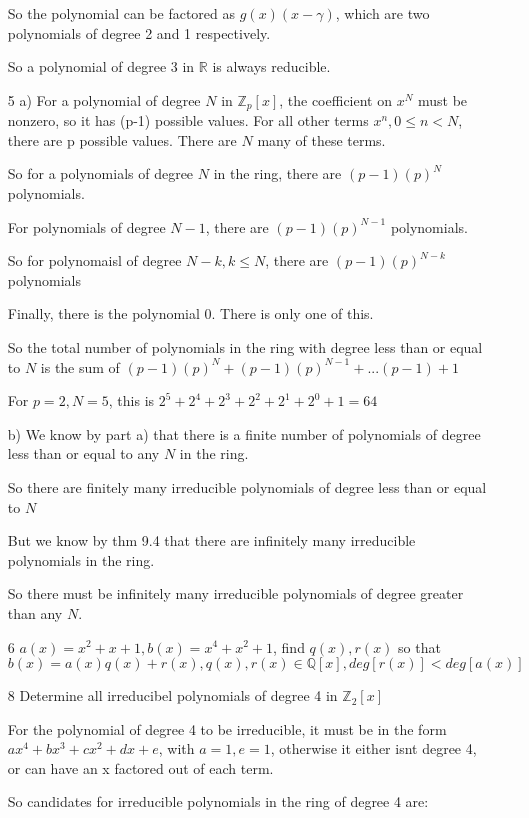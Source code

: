 \documentclass[12pt]{article}
\begin{document}
\begin{itemize}
  So the polynomial can be factored as $g(x)(x-\gamma)$, which are two polynomials of degree 2 and 1 respectively.

  So a polynomial of degree 3 in $\mathbb{R}$ is always reducible.

\item[5]
  a)
  For a polynomial of degree $N$ in $\mathbb{Z}_p [x]$, the coefficient on $x^N$ must be nonzero, so it has (p-1) possible values. For all other terms $x^n, 0 \leq n < N$, there are p possible values. There are $N$ many of these terms.

  So for a polynomials of degree $N$ in the ring, there are $(p-1)(p)^N$ polynomials.

  For polynomials of degree $N-1$, there are $(p-1)(p)^{N-1}$ polynomials.

  So for polynomaisl of degree $N-k, k \leq N$, there are $(p-1)(p)^{N-k}$ polynomials

  Finally, there is the polynomial 0. There is only one of this.

  So the total number of polynomials in the ring with degree less than or equal to $N$ is the sum of $(p-1)(p)^N + (p-1)(p)^{N-1} + ... (p-1) + 1$

  For $p = 2, N = 5$, this is $2^5 + 2^4 + 2^3 + 2^2 + 2^1 + 2^0 + 1 = 64$

  b) We know by part a) that there is a finite number of polynomials of degree less than or equal to any $N$ in the ring.

  So there are finitely many irreducible polynomials of degree less than or equal to $N$

  But we know by thm 9.4 that there are infinitely many irreducible polynomials in the ring.

  So there must be infinitely many irreducible polynomials of degree greater than any $N$.

\item[6]
  $a(x) = x^2 + x + 1, b(x) = x^4 + x^2 + 1$, find $q(x),r(x)$ so that $b(x) = a(x)q(x) + r(x), q(x),r(x) \in\mathbb{Q}[x], deg[r(x)] < deg[a(x)]$

\newpage
\item[8]
  Determine all irreducibel polynomials of degree 4 in $\mathbb{Z}_2 [x]$

  For the polynomial of degree 4 to be irreducible, it must be in the form $ax^4 + bx^3 + cx^2 + dx + e$, with $a = 1, e = 1$, otherwise it either isnt degree 4, or can have an x factored out of each term.

 So candidates for irreducible polynomials in the ring of degree 4 are: 


\end{itemize}
\end{document}

